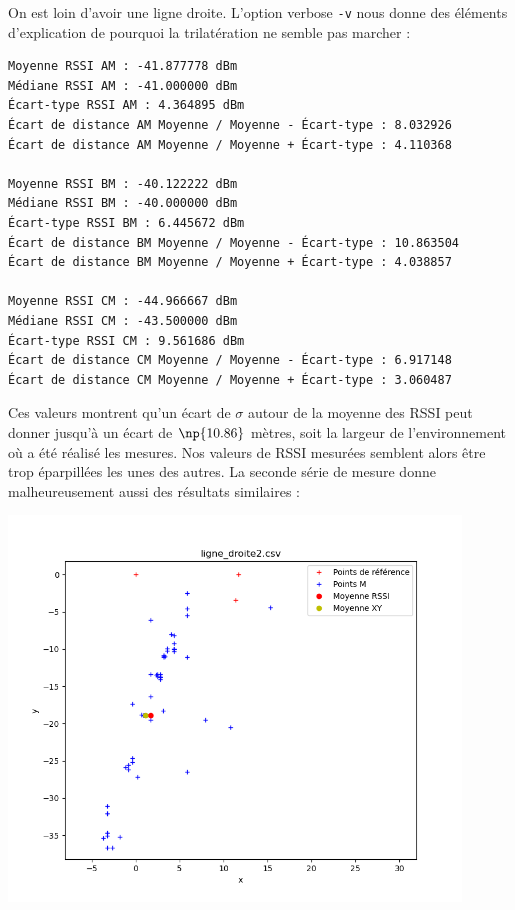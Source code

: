 \documentclass[french, a4paper, 12pt, parskip]{scrartcl}
\begin{document}
On est loin d'avoir une ligne droite. L'option verbose \verb+-v+ nous donne des
éléments d'explication de pourquoi la trilatération ne semble pas marcher :
\begin{verbatim}
Moyenne RSSI AM : -41.877778 dBm
Médiane RSSI AM : -41.000000 dBm
Écart-type RSSI AM : 4.364895 dBm
Écart de distance AM Moyenne / Moyenne - Écart-type : 8.032926
Écart de distance AM Moyenne / Moyenne + Écart-type : 4.110368

Moyenne RSSI BM : -40.122222 dBm
Médiane RSSI BM : -40.000000 dBm
Écart-type RSSI BM : 6.445672 dBm
Écart de distance BM Moyenne / Moyenne - Écart-type : 10.863504
Écart de distance BM Moyenne / Moyenne + Écart-type : 4.038857

Moyenne RSSI CM : -44.966667 dBm
Médiane RSSI CM : -43.500000 dBm
Écart-type RSSI CM : 9.561686 dBm
Écart de distance CM Moyenne / Moyenne - Écart-type : 6.917148
Écart de distance CM Moyenne / Moyenne + Écart-type : 3.060487
\end{verbatim}

Ces valeurs montrent qu'un écart de $\sigma$ autour de la moyenne des RSSI peut
donner jusqu'à un écart de $\np{10.86}$ mètres, soit la largeur de
l'environnement où a été réalisé les mesures. Nos valeurs de RSSI mesurées
semblent alors être trop éparpillées les unes des autres. La seconde série de
mesure  donne malheureusement aussi des résultats
similaires :
\begin{center}
  \includegraphics[width=0.9\textwidth]{trilat2.png}
\end{center}
\end{document}
